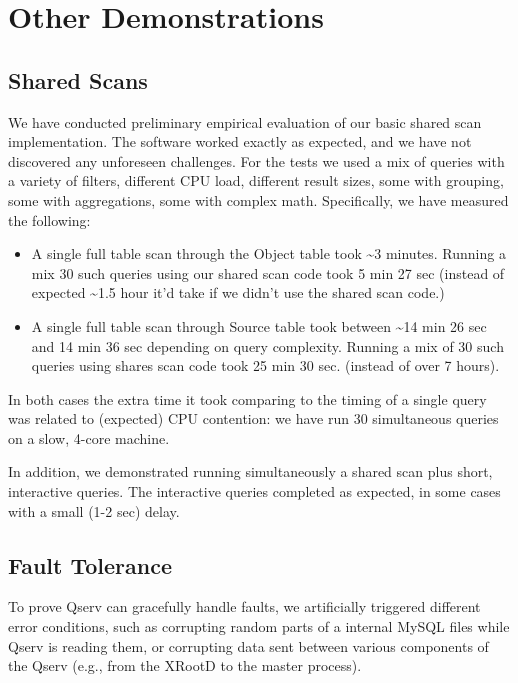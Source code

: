 \documentclass[DM,lsstdraft,toc]{lsstdoc}
\begin{document}
\section{Other Demonstrations}\label{other-demonstrations}

\subsection{Shared Scans}\label{shared-scans-1}

We have conducted preliminary empirical evaluation of our basic shared
scan implementation. The software worked exactly as expected, and we
have not discovered any unforeseen challenges. For the tests we used a
mix of queries with a variety of filters, different CPU load, different
result sizes, some with grouping, some with aggregations, some with
complex math. Specifically, we have measured the following:

\begin{itemize}
\item
  A single full table scan through the Object table took
  \textasciitilde{}3 minutes. Running a mix 30 such queries using our
  shared scan code took 5 min 27 sec (instead of expected
  \textasciitilde{}1.5 hour it'd take if we didn't use the shared scan
  code.)
\item
  A single full table scan through Source table took between
  \textasciitilde{}14 min 26 sec and 14 min 36 sec depending on query
  complexity. Running a mix of 30 such queries using shares scan code
  took 25 min 30 sec. (instead of over 7 hours).
\end{itemize}

In both cases the extra time it took comparing to the timing of a single
query was related to (expected) CPU contention: we have run 30
simultaneous queries on a slow, 4-core machine.

In addition, we demonstrated running simultaneously a shared scan plus
short, interactive queries. The interactive queries completed as
expected, in some cases with a small (1-2 sec) delay.

\subsection{Fault Tolerance}\label{fault-tolerance-1}

To prove Qserv can gracefully handle faults, we artificially triggered
different error conditions, such as corrupting random parts of a
internal MySQL files while Qserv is reading them, or corrupting data
sent between various components of the Qserv (e.g., from the
XRootD to the master process).
\end{document}
